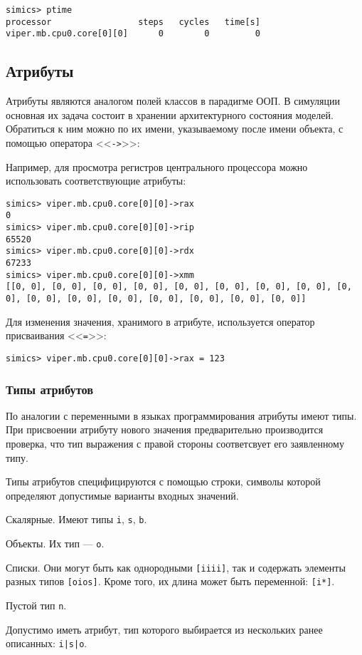 \begin{lstlisting}
simics> ptime
processor                 steps   cycles   time[s]
viper.mb.cpu0.core[0][0]      0        0         0
\end{lstlisting}


\subsection{Атрибуты}

Атрибуты являются аналогом полей классов в парадигме ООП. В симуляции основная их задача состоит в хранении архитектурного состояния моделей. Обратиться к ним можно по их имени, указываемому после имени объекта, с помощью оператора <<\texttt{->}>>:

Например, для просмотра регистров центрального процессора можно использовать соответствующие атрибуты:
\begin{lstlisting}
simics> viper.mb.cpu0.core[0][0]->rax
0
simics> viper.mb.cpu0.core[0][0]->rip
65520
simics> viper.mb.cpu0.core[0][0]->rdx
67233
simics> viper.mb.cpu0.core[0][0]->xmm
[[0, 0], [0, 0], [0, 0], [0, 0], [0, 0], [0, 0], [0, 0], [0, 0], [0, 0], [0, 0], [0, 0], [0, 0], [0, 0], [0, 0], [0, 0], [0, 0]]
\end{lstlisting}

Для изменения значения, хранимого в атрибуте, используется оператор присваивания <<\texttt{=}>>:
\begin{lstlisting}
simics> viper.mb.cpu0.core[0][0]->rax = 123
\end{lstlisting}

\subsubsection{Типы атрибутов}

По аналогии с переменными в языках программирования атрибуты имеют типы. При присвоении атрибуту нового значения предварительно производится проверка, что тип выражения с правой стороны соответсвует его заявленному типу.

Типы атрибутов специфицируются с помощью строки, символы которой определяют допустимые варианты входных значений.

\begin{enumerate*}
\item Скалярные. Имеют типы \texttt{i}, \texttt{s}, \texttt{b}.
\item Объекты. Их тип --- \texttt{o}.
\item Списки. Они могут быть как однородными \texttt{[iiii]}, так и содержать элементы разных типов \texttt{[oios]}. Кроме того, их длина может быть переменной: \texttt{[i*]}.
\item Пустой тип \texttt{n}.
\item Допустимо иметь атрибут, тип которого выбирается из нескольких ранее описанных: \texttt{i|s|o}.

\end{enumerate*}

